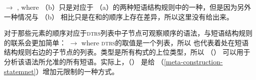 \ex 
{} $\to$ ,  where 
\zl
（b）只是对应于 （a）的两种短语结构规则中的一种，但是因为另外一种情况与 （b） 相比只是在和的顺序上存在差异，所以这里没有给出来。

对于那些元素的顺序对应于\textsc{dtrs}列表中子节点可观察顺序的语法，与短语结构规则的联系会更加简单：
\ea 
{} $\to$  where 
\z
\textsc{dtrs}的取值是一个列表，所以 也代表着处在短语结构规则右边的子节点的列表。类型是所有构式的上位类型，所以 （） 可以用于分析该语法所允准的所有短语。实际上，（） 是给 （\ref{meta-construction-statemnet}）增加元限制的一种方式。

